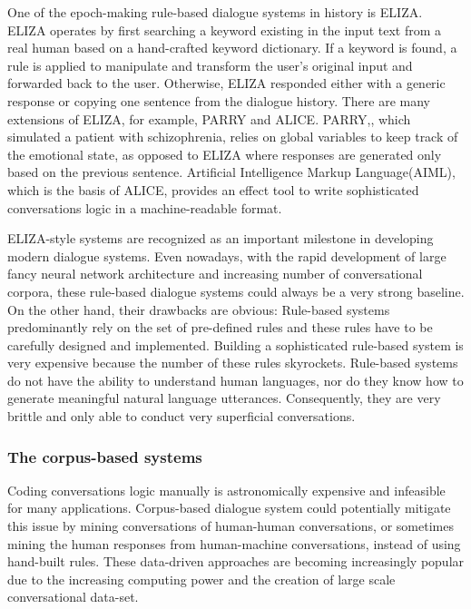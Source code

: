 \documentclass[bsc,frontabs,twoside,singlespacing,parskip,deptreport]{infthesis}     %
\begin{document}
One of the epoch-making rule-based dialogue systems in history is ELIZA\cite{weizenbaum1966eliza}. ELIZA operates by first searching a keyword existing in the input text from a real human based on a hand-crafted keyword dictionary. If a keyword is found, a rule is applied to manipulate and transform the user’s original input and forwarded back to the user. Otherwise, ELIZA responded either with a generic response or copying one sentence from the dialogue history. There are many extensions of ELIZA, for example, PARRY\cite{parkinson1977conversational} and ALICE\cite{wallace1995artificial}. PARRY,, which simulated a patient with schizophrenia, relies on global variables to keep track of the emotional state, as opposed to ELIZA where responses are generated only based on the previous sentence. Artificial Intelligence Markup Language(AIML), which is the basis of ALICE, provides an effect tool to write sophisticated conversations logic in a machine-readable format.

ELIZA-style systems are recognized as an important milestone in developing modern dialogue systems. Even nowadays, with the rapid development of large fancy neural network architecture and increasing number of conversational corpora, these rule-based dialogue systems could always be a very strong baseline. On the other hand, their drawbacks are obvious: Rule-based systems predominantly rely on the set of pre-defined rules and these rules have to be carefully designed and implemented. Building a sophisticated rule-based system is very expensive because the number of these rules skyrockets. Rule-based systems do not have the ability to understand human languages, nor do they know how to generate meaningful natural language utterances. Consequently, they are very brittle and only able to conduct very superficial conversations.

\subsubsection*{The corpus-based systems}

Coding conversations logic manually is astronomically expensive and infeasible for many applications. Corpus-based dialogue system could potentially mitigate this issue by mining conversations of human-human conversations, or sometimes mining the human responses from human-machine conversations, instead of using hand-built rules. These data-driven approaches are becoming increasingly popular due to the increasing computing power and the creation of large scale conversational data-set. 
\end{document}
